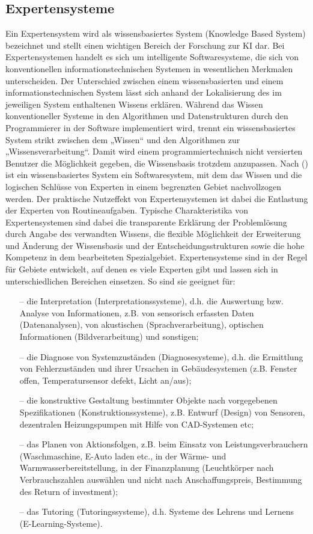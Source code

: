 \subsection{Expertensysteme}
Ein Expertensystem wird als wissensbasiertes System (Knowledge Based System) bezeichnet und stellt einen wichtigen Bereich der Forschung zur \gls{KI} dar. Bei Expertensystemen handelt es sich um intelligente Softwaresysteme, die sich von konventionellen informationstechnischen Systemen in wesentlichen Merkmalen unterscheiden. Der Unterschied zwischen einem wissensbasierten und einem informationstechnischen System lässt sich anhand der Lokalisierung des im jeweiligen System enthaltenen Wissens erklären. Während das Wissen konventioneller Systeme in den Algorithmen und Datenstrukturen durch den Programmierer in der Software implementiert wird, trennt ein wissensbasiertes System strikt zwischen dem „Wissen“ und den Algorithmen zur „Wissensverarbeitung“. Damit wird einem programmiertechnisch nicht versierten Benutzer die Möglichkeit gegeben, die Wissensbasis trotzdem anzupassen. Nach  () ist ein wissensbasiertes System ein Softwaresystem, mit dem das Wissen und die logischen Schlüsse von Experten in einem begrenzten Gebiet nachvollzogen werden. Der praktische Nutzeffekt von Expertensystemen ist dabei die Entlastung der Experten von Routineaufgaben. Typische Charakteristika von Expertensystemen sind dabei die transparente Erklärung der Problemlösung durch Angabe des verwandten Wissens, die flexible Möglichkeit der Erweiterung und Änderung der Wissensbasis und der Entscheidungsstrukturen sowie die hohe Kompetenz in dem bearbeiteten Spezialgebiet. Expertensysteme sind in der Regel für Gebiete entwickelt, auf denen es viele Experten gibt und lassen sich in unterschiedlichen Bereichen einsetzen. So sind sie geeignet für: 
\begin{itemize}
    \itemsep0em
    \item[--] die Interpretation (Interpretationssysteme), d.h. die Auswertung bzw. Analyse von Informationen, z.B. von sensorisch erfassten Daten (Datenanalysen), von akustischen (Sprachverarbeitung), optischen Informationen (Bildverarbeitung) und sonstigen;
    \item[--] die Diagnose von Systemzuständen (Diagnosesysteme), d.h. die Ermittlung von Fehlerzuständen und ihrer Ursachen in Gebäudesystemen (z.B. Fenster offen, Temperatursensor defekt, Licht an/aus);
    \item[--] die konstruktive Gestaltung bestimmter Objekte nach vorgegebenen Spezifikationen (Konstruktionssysteme), z.B. Entwurf (Design) von Sensoren, dezentralen Heizungspumpen mit Hilfe von CAD-Systemen etc;
    \item[--] das Planen von Aktionsfolgen, z.B. beim Einsatz von Leistungsverbrauchern (Waschmaschine, E-Auto laden etc., in der Wärme- und Warmwasserbereitstellung, in der Finanzplanung (Leuchtkörper nach Verbrauchszahlen auswählen und nicht nach Anschaffungspreis, Bestimmung des Return of investment);
    \item[--] das Tutoring (Tutoringssysteme), d.h. Systeme des Lehrens und Lernens (E-Learning-Systeme).
\end{itemize}

